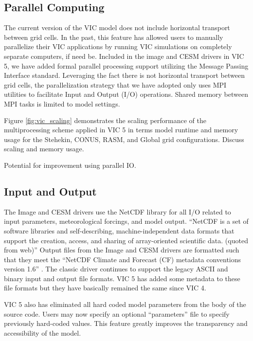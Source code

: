 \documentclass[gmd, manuscript]{copernicus}
\begin{document}
  \subsection{Parallel Computing}
    The current version of the VIC model does not include horizontal transport between grid cells.
    In the past, this feature has allowed users to manually parallelize their VIC applications by running VIC simulations on completely separate computers, if need be.
    Included in the image and CESM drivers in VIC 5, we have added formal parallel processing support utilizing the Message Passing Interface \citep[MPI][]{Gropp_1996} standard.
    Leveraging the fact there is not horizontal transport between grid cells, the parallelization strategy that we have adopted only uses MPI utilities to facilitate Input and Output (I/O) operations.
    Shared memory between MPI tasks is limited to model settings.

    Figure \ref{fig:vic_scaling} demonstrates the scaling performance of the multiprocessing scheme applied in VIC 5 in terms model runtime and memory usage for the Stehekin, CONUS, RASM, and Global grid configurations.
    Discuss scaling and memory usage.

    Potential for improvement using parallel IO.

  \subsection{Input and Output}
    The Image and CESM drivers use the NetCDF library for all I/O related to input parameters, meteorological forcings, and model output.
    ``NetCDF is a set of software libraries and self-describing, machine-independent data formats that support the creation, access, and sharing of array-oriented scientific data. (quoted from web)''
    Output files from the Image and CESM drivers are formatted such that they meet the ``NetCDF Climate and Forecast (CF) metadata conventions version 1.6'' \citep{Eaton_2003}.
    The classic driver continues to support the legacy ASCII and binary input and output file formats.
    VIC 5 has added some metadata to these file formats but they have basically remained the same since VIC 4.

    VIC 5 also has eliminated all hard coded model parameters from the body of the source code.
    Users may now specify an optional ``parameters'' file to specify previously hard-coded values.
    This feature greatly improves the transparency and accessibility of the model.
\end{document}
